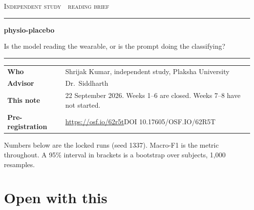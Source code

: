 \documentclass[11pt]{article}
\begin{document}
{\large\scshape\color{AccentSoft} Independent study\ \textbullet\ reading brief\par}
\vspace{0.28em}
{\color{Accent}\hrule height 1.15pt}
\vspace{0.55em}
{\LARGE\bfseries\color{Accent} physio-placebo\par}
\vspace{0.15em}
{\large Is the model reading the wearable, or is the prompt doing the classifying?\par}
\vspace{0.45em}
{\color{Accent}\hrule height 1.15pt}
\vspace{0.6em}

\begin{tabular}{@{}L{3.15cm}L{12.4cm}@{}}
\textbf{Who} & Shrijak Kumar, independent study, Plaksha University \\
\textbf{Advisor} & Dr.\ Siddharth \\
\textbf{This note} & 22 September 2026. Weeks 1--6 are closed. Weeks 7--8 have not started. \\
\textbf{Pre-registration} & \url{https://osf.io/62r5t}\quad DOI 10.17605/OSF.IO/62R5T \\
\end{tabular}

\vspace{0.15em}
{\small\color{Muted}
Numbers below are the locked runs (seed 1337). Macro-F1 is the metric throughout.
A 95\% interval in brackets is a bootstrap over subjects, 1{,}000 resamples.
\par}

\section{Open with this}
\end{document}

